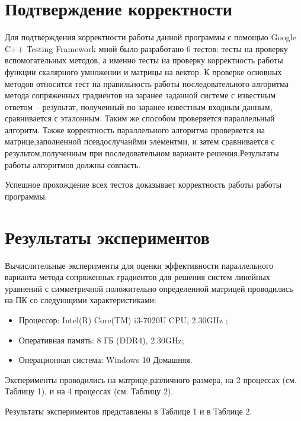 \documentclass{report}
\begin{document}
\section*{Подтверждение корректности}
Для подтверждения корректности работы данной программы с помощью Google C++ Testing Framework мной было разработано 6 тестов: тесты на проверку вспомогательных методов, а именно тесты на проверку корректность работы функции скалярного умножении и матрицы на вектор. К проверке основных методов относится тест на правильность работы последовательного алгоритма метода сопряженных градиентов на заранее заданной системе с известным ответом – результат, полученный по заранее известным входным данным, сравнивается с эталонным. Таким же способом проверяется параллельный алгоритм. Также корректность параллельного алгоритма проверяется на матрице,заполненной псевдослучанйми элементми, и затем сравнивается с результом,полученным при последовательном варианте решения.Результаты работы алгоритмов должны совпасть.
\par Успешное прохождение всех тестов доказывает корректность работы работы программы.
\newpage

\section*{Результаты экспериментов}
Вычислительные эксперименты для оценки эффективности параллельного варианта
метода сопряженных градиентов для решения систем линейных уравнений с симметричной положительно определенной матрицей  проводились на ПК со следующими характеристиками:
\begin{itemize}
\item Процессор: Intel(R) Core(TM) i3-7020U CPU, 2.30GHz ;
\item Оперативная память: 8 ГБ (DDR4), 2.30GHz;
\item Операционная система: Windows 10 Домашняя.
\end{itemize}

\par Эксперименты проводились на матрице,различного размера, на 2 процессах (см. Таблицу 1), и на 4 процессах (см. Таблицу 2).

\par Результаты экспериментов представлены в Таблице 1 и в Таблице 2.
\end{document}
